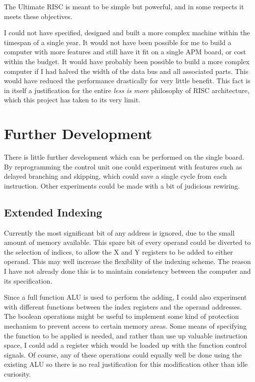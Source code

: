 The Ultimate RISC is meant to be simple but powerful, and in some respects it meets these objectives.

I could not have  specified, designed and built a more complex machine within the timespan of a single year.
It would not have been possible for me to build a computer with more features and still have it fit on a single APM board, or cost within the budget.
It would have probably been possible to build  a more complex computer if I had halved the width of the data bus and all associated parts. 
This would have reduced the performance drastically for very little benefit.
This fact is in itself  a justification for the entire {\em less is more} philosophy of RISC architecture, which this project has taken to its very limit.

\section{Further Development}

There is little further development which can be performed on the single board.
By reprogramming the control unit one could experiment with features such
as delayed branching and skipping, which could  save a single cycle from each instruction. 
Other experiments could be made with a bit of judicious rewiring.

\subsection{Extended Indexing}
Currently the most significant bit of any address is ignored, due to the small amount of memory available. 
This spare bit of every operand could be diverted to the selection of indices, to allow the X and Y registers to be added to either operand. 
This may well increase the flexibility of the indexing scheme.
The reason I have not already done this is to maintain consistency between the computer and its specification.

Since a full function ALU is used to perform the adding, I could also experiment with different functions between the index registers and the operand addresses.
The boolean operations might be useful to implement some kind of protection mechanism to prevent access to certain  memory areas. 
Some means of specifying the function to be applied is needed, and rather than use up valuable instruction space, I could add a register which would be loaded up with the function control signals.
 Of course, any of these operations could equally well be done using the existing ALU so  there is no real justification for 
this modification other than idle curiosity.


